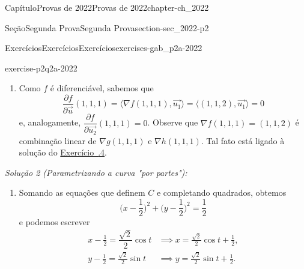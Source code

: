 \documentclass[oneside,10pt,]{book}
\newcommand{\xreffont}{\relax}
\numberwithin{equation}{section}
\begin{document}
\begin{chapterptx}{Capítulo}{Provas de 2022}{}{Provas de 2022}{}{}{chapter-ch_2022}
\begin{sectionptx}{Seção}{Segunda Prova}{}{Segunda Prova}{}{}{section-sec_2022-p2}
\begin{exercises-subsection-numberless}{Exercícios}{Exercícios}{}{Exercícios}{}{}{exercises-gab_p2a-2022}
\begin{divisionexercise}{2}{}{}{exercise-p2q2a-2022}
\begin{enumerate}[label=(\alph*)]
\begin{equation*}
z^2,
\end{equation*}
cujos gradientes são%
\begin{equation*}
\nabla g(x,y,z) = 2(x,y,-z)
\quad \text{e} \quad \nabla h(x,y,z) = 2 (x-1, y-1, z).
\end{equation*}
Em particular, \(\nabla g(1,1,1) = 2(1,1,-1)\) e \(\nabla
h(1,1,1) = 2(0,0,1)\) são linearmente independentes. Como \(C\) é a intersecção das superfícies de nível \(c=1\) de \(g\) e \(h\), sabemos que a reta tangente a \(C\) em \((1,1,1)\) é a interseção dos planos tangentes às superfícies de nível acima e portanto normal aos vetores \((1,1,-1)\) e \((0,0,1)\). Deste modo, um vetor diretor desta reta é%
\begin{equation*}
\vec{v} = (1,1,-1) \times (0,0,1) =
(1,-1,0).
\end{equation*}
Assim, os vetores%
\begin{equation*}
\vec{u_1} =
\frac{1}{\sqrt{2}}(1,-1,0) \quad \text{e} \quad \vec{u_2} =
\frac{1}{\sqrt{2}}(-1,1,0)
\end{equation*}
são ambos unitários e tangentes a \(C\) em \((1,1,1)\).%
\item{}Como \(f\) é diferenciável, sabemos que%
\begin{equation*}
\frac{\partial f}{\partial \vec{u}}(1,1,1) = \big\langle
\nabla f(1,1,1), \vec{u_1}\big\rangle = \big\langle (1,1,2),
\vec{u_1}\big\rangle = 0
\end{equation*}
e, analogamente, \(\dfrac{\partial f}{\partial \vec{u_2}}(1,1,1) =
0\). Observe que \(\nabla f(1,1,1) = (1,1,2)\) é combinação linear de \(\nabla g(1,1,1)\) e \(\nabla h(1,1,1)\). Tal fato está ligado à solução do \hyperlink{exercise-p2q4a-2022}{Exercício~{\xreffont 3.2.4}}.%
\end{enumerate}
%
\par
\emph{Solução 2 (Parametrizando a curva "por partes"):}%
\begin{enumerate}[label=\alph*]
\item{}Somando as equações que definem \(C\) e completando quadrados, obtemos%
\begin{equation*}
\Big(x - \frac{1}{2}\Big)^2 + \Big(y
- \frac{1}{2}\Big)^2 = \frac{1}{2}
\end{equation*}
e podemos escrever%
\begin{align*}
x - \frac{1}{2} = \dfrac{\sqrt{2}}{2}\cos t
&\implies x = \frac{\sqrt{2}}{2}\cos t +
\frac{1}{2},\\
y - \frac{1}{2} = \frac{\sqrt{2}}{2}\sin t
&\implies y = \frac{\sqrt{2}}{2}\sin t +
\frac{1}{2}.

\end{align*}
\end{enumerate}
\end{divisionexercise}
\end{exercises-subsection-numberless}
\end{sectionptx}
\end{chapterptx}
\end{document}
